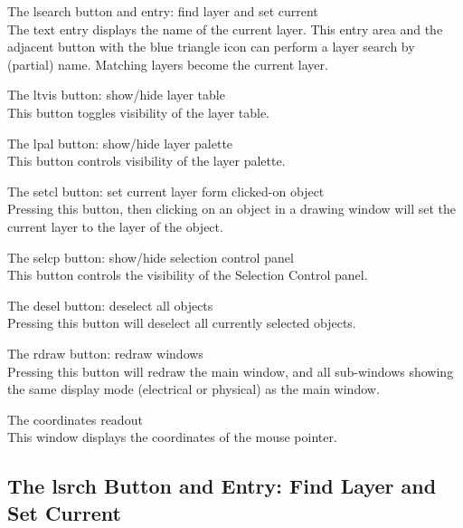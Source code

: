 \begin{description}
\item{The {\cb lsearch} button and entry: find layer and set current}\\
The text entry displays the name of the current layer.  This entry
area and the adjacent button with the blue triangle icon can
perform a layer search by (partial) name.  Matching layers become
the current layer.

\item{The {\cb ltvis} button: show/hide layer table}\\
This button toggles visibility of the layer table.

\item{The {\cb lpal} button: show/hide layer palette}\\
This button controls visibility of the layer palette.

\item{The {\cb setcl} button:  set current layer form clicked-on
 object}\\
Pressing this button, then clicking on an object in a
drawing window will set the current layer to the layer of the object.

\item{The {\cb selcp} button: show/hide selection control panel}\\
This button controls the visibility of the {\cb Selection
Control} panel.

\item{The {\cb desel} button: deselect all objects}\\
Pressing this button will deselect all currently selected objects.

\item{The {\cb rdraw} button: redraw windows}\\
Pressing this button will redraw the main window, and all sub-windows
showing the same display mode (electrical or physical) as the main
window.

\item{The coordinates readout}\\
This window displays the coordinates of the mouse pointer.
\end{description}

\subsection{The {\cb lsrch} Button and Entry: Find Layer and Set Current}
\label{lsrch}

